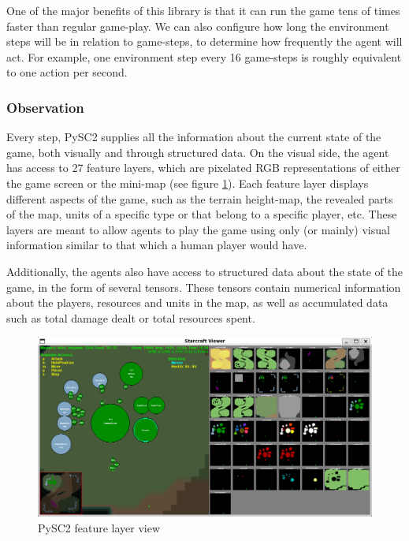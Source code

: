 One of the major benefits of this library is that it can run the game tens of times faster than regular game-play. We can also configure how long the environment steps will be in relation to game-steps, to determine how frequently the agent will act. For example, one environment step every 16 game-steps is roughly equivalent to one action per second.

\subsubsection*{Observation}

Every step, PySC2 supplies all the information about the current state of the game, both visually and through structured data. On the visual side, the agent has access to 27 feature layers, which are pixelated RGB representations of either the game screen or the mini-map (see figure \ref{fig:feature_layers}). Each feature layer displays different aspects of the game, such as the terrain height-map, the revealed parts of the map, units of a specific type or that belong to a specific player, etc. These layers are meant to allow agents to play the game using only (or mainly) visual information similar to that which a human player would have.

Additionally, the agents also have access to structured data about the state of the game, in the form of several tensors. These tensors contain numerical information about the players, resources and units in the map, as well as accumulated data such as total damage dealt or total resources spent.

\begin{figure}[h]
    \centering
    \includegraphics[width=1\textwidth]{figs/feature_layers.png}
    \caption{PySC2 feature layer view}
    \label{fig:feature_layers}
\end{figure}

